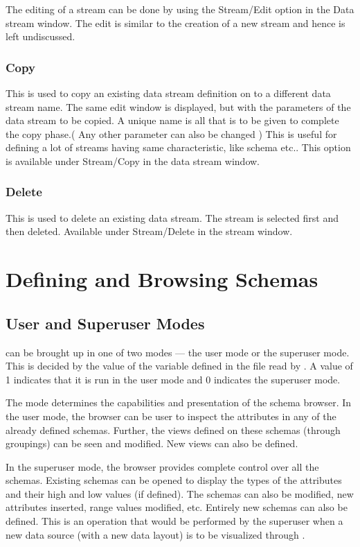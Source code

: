 The editing of a stream can be done by using the Stream/Edit option in the Data stream window. The edit is similar to the creation of a new stream and hence is left undiscussed. 

\subsubsection{Copy}

This is used to copy an existing  data stream definition on to a different data stream name. The same edit window is displayed, but with the parameters of the data stream to be copied. A unique name is all that is to be given to complete the copy phase.( Any other parameter can also be changed ) This is useful for defining a lot of streams having same characteristic, like schema etc.. This option is available under Stream/Copy in the data stream window.

\subsubsection{Delete}

This is used to delete an existing  data stream. The stream is selected first and then deleted. Available under Stream/Delete in the stream window.

\section{Defining and Browsing Schemas}

\subsection{User and Superuser Modes}

\Devise can be brought up in one of two modes --- the user mode or the
superuser mode.  This is decided by the value of the variable
 defined in the  file read by
\Devise.  A value of 1 indicates that it is run in the user mode and 0
indicates the superuser mode.

The mode determines the capabilities and presentation of the schema
browser.  In the user mode, the browser can be user to inspect the
attributes in any of the already defined schemas. Further, the views
defined on these schemas (through groupings) can be seen and
modified. New views can also be defined.

In the superuser mode, the browser provides complete control over all
the schemas. Existing schemas can be opened to display the types of
the attributes and their high and low values (if defined). The schemas
can also be modified, new attributes inserted, range values modified,
etc. Entirely new schemas can also be defined.  This is an operation
that would be performed by the superuser when a new data source (with
a new data layout) is to be visualized through \Devise.

